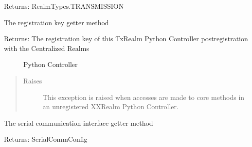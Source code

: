 \documentclass[letterpaper,10pt,english]{sphinxmanual}
\begin{document}
\begin{fulllineitems}
\begin{fulllineitems}
\sphinxAtStartPar
Returns: RealmTypes.TRANSMISSION

\end{fulllineitems}


\begin{fulllineitems}
\label{\detokenize{TxRealm:TxRealm.TxController.registration_key}}
\sphinxAtStartPar
The registration key getter method
\begin{description}
\item[{Returns: The registration key of this TxRealm Python Controller post\sphinxhyphen{}registration with the Centralized Realms}] \leavevmode
\sphinxAtStartPar
Python Controller

\end{description}
\begin{quote}\begin{description}
\item[{Raises}] \leavevmode
\sphinxAtStartPar
{} \textendash{} This exception is raised when accesses are made to core methods
    in an unregistered XXRealm Python Controller.

\end{description}\end{quote}

\end{fulllineitems}


\begin{fulllineitems}
\label{\detokenize{TxRealm:TxRealm.TxController.serial_comm}}
\sphinxAtStartPar
The serial communication interface getter method

\sphinxAtStartPar
Returns: SerialCommConfig

\end{fulllineitems}



\end{fulllineitems}
\end{document}
